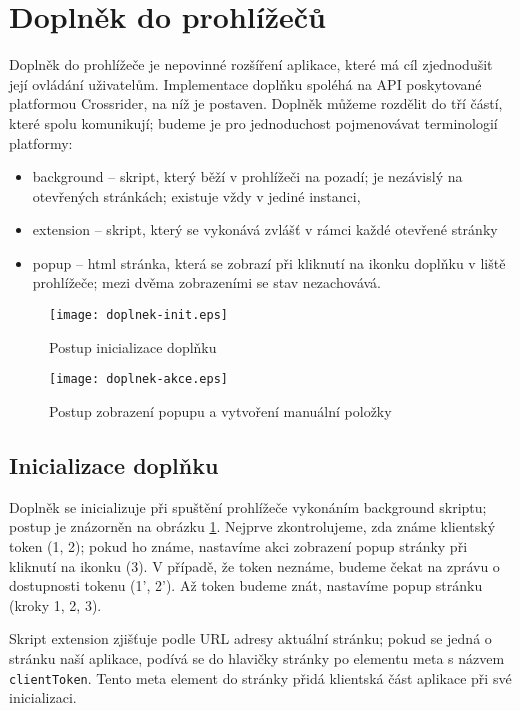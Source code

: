 \section{Doplněk do prohlížečů}

Doplněk do prohlížeče je nepovinné rozšíření aplikace, které má cíl zjednodušit její ovládání uživatelům.
Implementace doplňku spoléhá na API poskytované platformou Crossrider, na níž je postaven.
Doplněk můžeme rozdělit do tří částí, které spolu komunikují; budeme je pro jednoduchost pojmenovávat terminologií platformy:
\begin{itemize}
	\item background -- skript, který běží v prohlížeči na pozadí; je nezávislý na otevřených stránkách; existuje vždy v jediné instanci,
	\item extension -- skript, který se vykonává zvlášť v rámci každé otevřené stránky
	\item popup -- html stránka, která se zobrazí při kliknutí na ikonku doplňku v liště prohlížeče; mezi dvěma zobrazeními se stav nezachovává.
\end{itemize}

\begin{figure}
	\centering
	\texttt{[image: doplnek-init.eps]}
	\caption{Postup inicializace doplňku}
	\label{fig:doplnek-init}
\end{figure}
\begin{figure}
	\centering
	\texttt{[image: doplnek-akce.eps]}
	\caption{Postup zobrazení popupu a vytvoření manuální položky}
	\label{fig:doplnek-akce}
\end{figure}

\subsection{Inicializace doplňku}

Doplněk se inicializuje při spuštění prohlížeče vykonáním background skriptu; postup je znázorněn na obrázku \ref{fig:doplnek-init}.
Nejprve zkontrolujeme, zda známe klientský token (1, 2); pokud ho známe, nastavíme akci zobrazení popup stránky při kliknutí na ikonku (3).
V případě, že token neznáme, budeme čekat na zprávu o dostupnosti tokenu (1', 2').
Až token budeme znát, nastavíme popup stránku (kroky 1, 2, 3).

Skript extension zjišťuje podle URL adresy aktuální stránku; pokud se jedná o stránku naší aplikace, podívá se do hlavičky stránky po elementu meta s názvem \verb|clientToken|.
Tento meta element do stránky přidá klientská část aplikace při své inicializaci.

